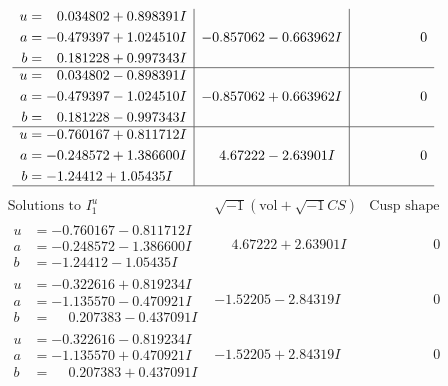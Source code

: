 \documentclass[1p]{elsarticle_modified}
\theoremstyle{definition}
\newcommand{\I}{\sqrt{-1}}
\begin{document}
$$\begin{array}{c|c|c}
\begin{aligned}
u &= \phantom{-}0.034802 + 0.898391 I \\
a &= -0.479397 + 1.024510 I \\
b &= \phantom{-}0.181228 + 0.997343 I\end{aligned}
 & -0.857062 - 0.663962 I & \phantom{-0.000000 } 0 \\ \hline\begin{aligned}
u &= \phantom{-}0.034802 - 0.898391 I \\
a &= -0.479397 - 1.024510 I \\
b &= \phantom{-}0.181228 - 0.997343 I\end{aligned}
 & -0.857062 + 0.663962 I & \phantom{-0.000000 } 0 \\ \hline\begin{aligned}
u &= -0.760167 + 0.811712 I \\
a &= -0.248572 + 1.386600 I \\
b &= -1.24412 + 1.05435 I\end{aligned}
 & \phantom{-}4.67222 - 2.63901 I & \phantom{-0.000000 } 0\\
 \hline 
 \end{array}$$\newpage$$\begin{array}{c|c|c}  
\text{Solutions to }I^u_{1}& \I (\text{vol} + \sqrt{-1}CS) & \text{Cusp shape}\\
 \hline 
\begin{aligned}
u &= -0.760167 - 0.811712 I \\
a &= -0.248572 - 1.386600 I \\
b &= -1.24412 - 1.05435 I\end{aligned}
 & \phantom{-}4.67222 + 2.63901 I & \phantom{-0.000000 } 0 \\ \hline\begin{aligned}
u &= -0.322616 + 0.819234 I \\
a &= -1.135570 - 0.470921 I \\
b &= \phantom{-}0.207383 - 0.437091 I\end{aligned}
 & -1.52205 - 2.84319 I & \phantom{-0.000000 } 0 \\ \hline\begin{aligned}
u &= -0.322616 - 0.819234 I \\
a &= -1.135570 + 0.470921 I \\
b &= \phantom{-}0.207383 + 0.437091 I\end{aligned}
 & -1.52205 + 2.84319 I & \phantom{-0.000000 } 0 \\ \hline\begin{aligned}

\end{aligned}
\end{array}$$
\end{document}
